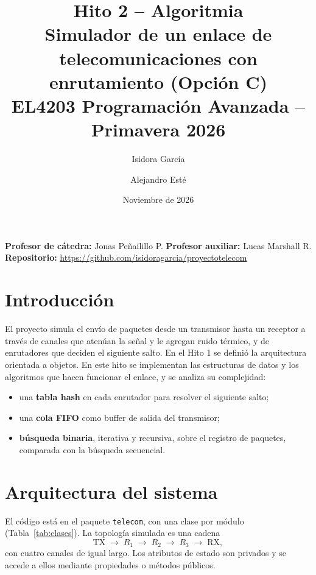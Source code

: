 \documentclass[11pt,a4paper]{article}
\title{Hito 2 -- Algoritmia\\[4pt]
\large Simulador de un enlace de telecomunicaciones con enrutamiento (Opción C)\\[4pt]
\normalsize EL4203 Programación Avanzada -- Primavera 2026}
\author{Isidora García \and Alejandro Esté}
\date{Noviembre de 2026}
\begin{document}
\maketitle

\noindent\textbf{Profesor de cátedra:} Jonas Peñailillo P. \hfill
\textbf{Profesor auxiliar:} Lucas Marshall R.\\
\textbf{Repositorio:} \url{https://github.com/isidoragarcia/proyectotelecom}

\section{Introducción}

El proyecto simula el envío de paquetes desde un transmisor hasta un receptor a
través de canales que atenúan la señal y le agregan ruido térmico, y de
enrutadores que deciden el siguiente salto. En el Hito 1 se definió la
arquitectura orientada a objetos. En este hito se implementan las estructuras
de datos y los algoritmos que hacen funcionar el enlace, y se analiza su
complejidad:

\begin{itemize}
  \item una \textbf{tabla hash} en cada enrutador para resolver el siguiente salto;
  \item una \textbf{cola FIFO} como buffer de salida del transmisor;
  \item \textbf{búsqueda binaria}, iterativa y recursiva, sobre el registro de
        paquetes, comparada con la búsqueda secuencial.
\end{itemize}

\section{Arquitectura del sistema}

El código está en el paquete \texttt{telecom}, con una clase por módulo
(Tabla~\ref{tab:clases}). La topología simulada es una cadena
\[
\text{TX} \;\longrightarrow\; R_1 \;\longrightarrow\; R_2 \;\longrightarrow\; R_3 \;\longrightarrow\; \text{RX},
\]
con cuatro canales de igual largo. Los atributos de estado son privados y se
accede a ellos mediante propiedades o métodos públicos.
\end{document}
